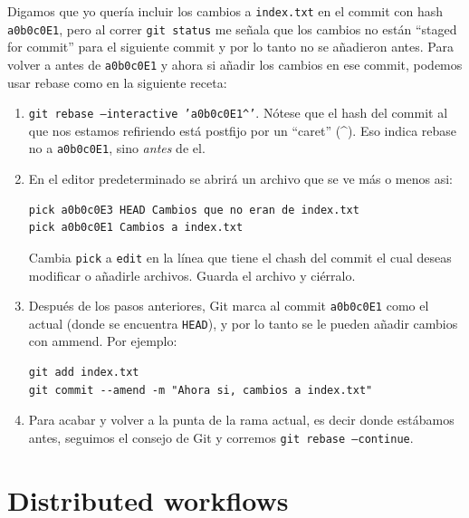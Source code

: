 \documentclass[spanish, 12pt, a4paper]{article}
\begin{document}
Digamos que yo quería incluir los cambios a \texttt{index.txt} en el commit con hash \texttt{a0b0c0E1}, pero al correr \texttt{git status} me señala que los cambios no están ``staged for commit'' para el siguiente commit y por lo tanto no se añadieron antes.
Para volver a antes de \texttt{a0b0c0E1} y ahora si añadir los cambios en ese commit, podemos usar rebase como en la siguiente receta:

\begin{enumerate}
	\item \texttt{git rebase --interactive 'a0b0c0E1\string^'}. Nótese que el hash del commit al que nos estamos refiriendo está postfijo por un ``caret'' (\string^). Eso indica rebase no a \texttt{a0b0c0E1}, sino \textit{antes} de el.
	\item En el editor predeterminado se abrirá un archivo que se ve más o menos asi:
\begin{lstlisting}
pick a0b0c0E3 HEAD Cambios que no eran de index.txt
pick a0b0c0E1 Cambios a index.txt
\end{lstlisting}
	Cambia \texttt{pick} a \texttt{edit} en la línea que tiene el chash del commit el cual deseas modificar o añadirle archivos. Guarda el archivo y ciérralo.
	\item Después de los pasos anteriores, Git marca al commit \texttt{a0b0c0E1} como el actual (donde se encuentra \texttt{HEAD}), y por lo tanto se le pueden añadir cambios con ammend. Por ejemplo:
\begin{lstlisting}
git add index.txt
git commit --amend -m "Ahora si, cambios a index.txt"
\end{lstlisting}
	\item Para acabar y volver a la punta de la rama actual, es decir donde estábamos antes, seguimos el consejo de Git y corremos \texttt{git rebase --continue}.
\end{enumerate}


\section{Distributed workflows}
\end{document}
